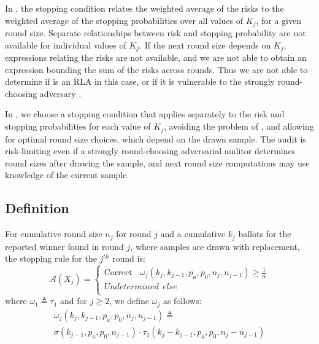 In \Minerva, the stopping condition relates the weighted average of the risks to the weighted average of the stopping probabilities over all values of $K_j$, for a given round size. Separate relationships between risk and stopping probability are not available for individual values of $K_j$. If the next round size depends on $K_j$, expressions relating the risks are not available, and we are not able to obtain an expression bounding the sum of the risks across rounds. Thus we are not able to determine if \Minerva is an RLA in this case, or if it is vulnerable to the strongly round-choosing adversary \cite{usenix_minerva, arxiv_athena, alpha}. 

In \Providence, we choose a stopping condition that applies separately to the risk and stopping probabilities for each value of $K_j$, avoiding the problem of \Minerva, and allowing for optimal round size choices, which depend on the drawn sample. 
The \Providence audit is risk-limiting even if a strongly round-choosing adversarial auditor determines round sizes after drawing the sample, and next round size computations may use knowledge of the current sample. 

\subsection{Definition}
\label{sec:prov_def}
\begin{definition}
    \label{def:minervatwo}
    For cumulative round size $n_j$ for round $j$ and a cumulative $k_j$ ballots for the reported winner found in round $j$, where samples are drawn with replacement, the \R \Providence stopping rule for the $j^{th}$ round is:
$$
\mathcal{A}(X_{j})=  \left\{ \begin{array}{ll} \text{Correct} ~~~~ \omega_{j}(k_{j}, k_{j-1}, p_a, p_0, n_j, n_{j-1}) \geq \frac{1}{\alpha}\\
        Undetermined ~~else \\
    \end{array}
    \right .
$$
where $\omega _{1}\triangleq \tau_{1}$ and for $j\ge 2$, we define $\omega _{j}$ as follows:
\begin{equation}
    \begin{aligned}
    \omega_{j}(k_{j}, k_{j-1}, p_a, p_0, n_{j}, n_{j-1})
    \triangleq\\
    \sigma(k_{j-1},p_a,p_0,n_{j-1})\cdot \tau_1(k_{j}-k_{j-1},p_a,p_0,n_j-n_{j-1})
    \end{aligned}
\end{equation}
\end{definition}

